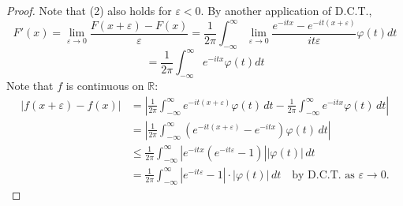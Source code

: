 \begin{proof}
Note that (2) also holds for $\varepsilon < 0$. By another application of D.C.T.,
\[
F'(x) = \lim_{\varepsilon \to 0} \frac{F(x+\varepsilon) - F(x)}{\varepsilon} = \frac{1}{2\pi} \int_{-\infty}^{\infty} \lim_{\varepsilon \to 0} \frac{e^{-itx} - e^{-it(x+\varepsilon)}}{it\varepsilon} \varphi(t) dt
\]
\[
= \frac{1}{2\pi} \int_{-\infty}^{\infty} e^{-itx} \varphi(t) dt
\]
Note that $f$ is continuous on $\mathbb{R}$:
\begin{align*}
|f(x+\varepsilon) - f(x)| &= \left| \frac{1}{2\pi} \int_{-\infty}^{\infty} e^{-it(x+\varepsilon)} \varphi(t) \, dt - \frac{1}{2\pi} \int_{-\infty}^{\infty} e^{-itx} \varphi(t) \, dt \right| \\
&= \left| \frac{1}{2\pi} \int_{-\infty}^{\infty} (e^{-it(x+\varepsilon)} - e^{-itx}) \varphi(t) \, dt \right| \\
&\leq \frac{1}{2\pi} \int_{-\infty}^{\infty} |e^{-itx} (e^{-it\varepsilon} - 1)| |\varphi(t)| \, dt \\
&= \frac{1}{2\pi} \int_{-\infty}^{\infty} |e^{-it\varepsilon} - 1| \cdot |\varphi(t)| \, dt \quad \text{by D.C.T. as } \varepsilon \to 0.
\end{align*}
\end{proof}

